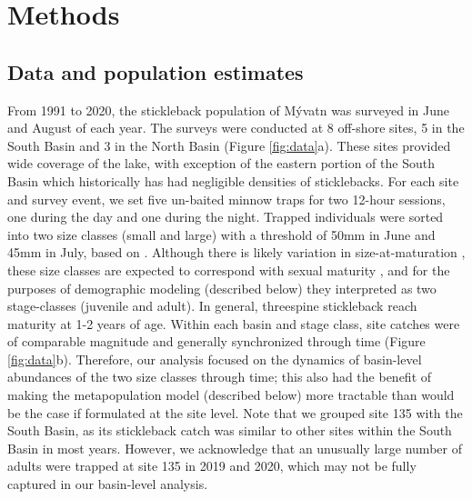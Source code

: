 \documentclass[11pt]{article}
\begin{document}
\section*{Methods} 



\subsection*{Data and population estimates} 

From 1991 to 2020, 
the stickleback population of M\'{y}vatn was surveyed in June and August of each year. 
The surveys were conducted at 8 off-shore sites, 
5 in the South Basin and 3 in the North Basin
(Figure \ref{fig:data}a).
These sites provided wide coverage of the lake,
with exception of the eastern portion of the South Basin 
which historically has had negligible densities of sticklebacks.
For each site and survey event, 
we set five un-baited minnow traps for two 12-hour sessions, 
one during the day and one during the night. 
Trapped individuals were sorted into two size classes (small and large)
with a threshold of 50mm in June and 45mm in July, based on \citep{gislason1998}. 
Although there is likely variation in size-at-maturation \citep{singkam2019},
these size classes are expected to correspond with sexual maturity \citep{gislason1998},
and for the purposes of demographic modeling (described below) 
they interpreted as two stage-classes (juvenile and adult).
In general, threespine stickleback reach maturity at 1-2 years of age.
Within each basin and stage class, 
site catches were of comparable magnitude and 
generally synchronized through time (Figure \ref{fig:data}b).
Therefore, our analysis focused on the dynamics of basin-level abundances
of the two size classes through time;
this also had the benefit of making the metapopulation model (described below) more tractable
than would be the case if formulated at the site level.
Note that we grouped site 135 with the South Basin, 
as its stickleback catch was similar to other sites within the South Basin in most years.
However, 
we acknowledge that an unusually large number of adults were trapped at site 135
in 2019 and 2020, which may not be fully captured in our basin-level analysis.
\end{document}
